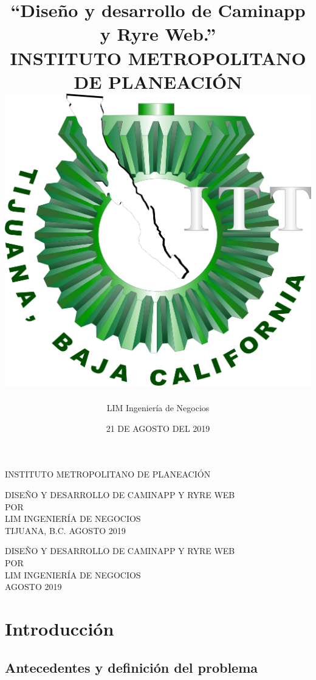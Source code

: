\documentclass[12pt]{report}
\title{
   {“Diseño y desarrollo de Caminapp y Ryre Web.”}\\
   {\large INSTITUTO METROPOLITANO DE PLANEACIÓN}\\
   {\includegraphics{escudo1.png}}
}
\author{LIM Ingeniería de Negocios}
\date{21 DE AGOSTO DEL 2019}
\begin{document}
\setcounter{page}{1}
\thispagestyle{empty}
\begin{center}
   INSTITUTO METROPOLITANO DE PLANEACIÓN\\[0.75cm]
\end{center}
\begin{figure}[h]
\begin{center}

\vspace{0cm}
\end{center}
\end{figure}
\vspace{1cm}
\begin{center}
DISEÑO Y DESARROLLO DE CAMINAPP Y RYRE WEB\\[4mm]
POR\\[4mm]
LIM INGENIERÍA DE NEGOCIOS\\[1cm]
\vfill
TIJUANA, B.C. \hfill AGOSTO 2019
\end{center}

\newpage
\thispagestyle{empty}
\begin{center}
DISEÑO Y DESARROLLO DE CAMINAPP Y RYRE WEB\\[1.3cm]
POR\\[0.8cm]
LIM INGENIERÍA DE NEGOCIOS\\[0.8cm]
\small AGOSTO 2019\\[0.7cm]
\end{center}

\newpage

 
\newpage
\tableofcontents

\newpage
\listoftables
{} %
\listoffigures
{}
\lstlistoflistings

\chapter{Introducción}


\section{Antecedentes y definición del problema}

\end{document}
